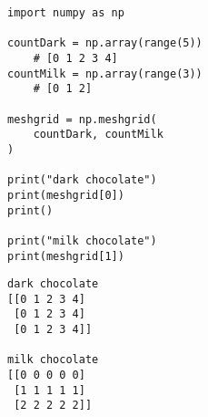 
\begin{frame}[fragile]
%
\begin{tcbraster}[raster columns=2,
                  raster equal height,
                  nobeforeafter,
                  raster column skip=0.2cm]
\begin{codebox}
\begin{verbatim}
import numpy as np

countDark = np.array(range(5))
    # [0 1 2 3 4]
countMilk = np.array(range(3))
    # [0 1 2]
    
meshgrid = np.meshgrid(
    countDark, countMilk
)

print("dark chocolate")
print(meshgrid[0])
print()

print("milk chocolate")
print(meshgrid[1])
\end{verbatim}
\end{codebox}
%
\begin{cmdbox}
\begin{verbatim}
dark chocolate
[[0 1 2 3 4]
 [0 1 2 3 4]
 [0 1 2 3 4]]

milk chocolate
[[0 0 0 0 0]
 [1 1 1 1 1]
 [2 2 2 2 2]]
\end{verbatim}
\end{cmdbox}
\end{tcbraster}
%
\end{frame}


